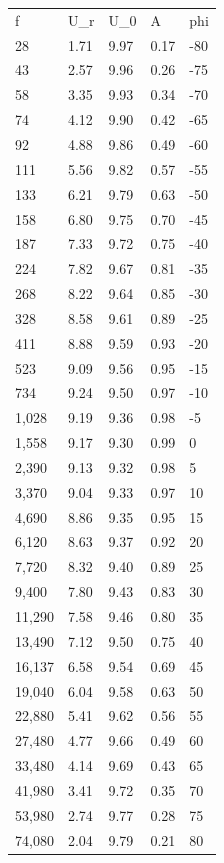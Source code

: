 \documentclass[UTF8]{ctexart}
\begin{document}
\begin{table}[htbp]
\centering
\begin{tabular}{|l|l|l|l|l|}
f&U\_r&U\_0&A&phi\\
28&1.71&9.97&0.17&-80\\
43&2.57&9.96&0.26&-75\\
58&3.35&9.93&0.34&-70\\
74&4.12&9.90&0.42&-65\\
92&4.88&9.86&0.49&-60\\
111&5.56&9.82&0.57&-55\\
133&6.21&9.79&0.63&-50\\
158&6.80&9.75&0.70&-45\\
187&7.33&9.72&0.75&-40\\
224&7.82&9.67&0.81&-35\\
268&8.22&9.64&0.85&-30\\
328&8.58&9.61&0.89&-25\\
411&8.88&9.59&0.93&-20\\
523&9.09&9.56&0.95&-15\\
734&9.24&9.50&0.97&-10\\
1,028&9.19&9.36&0.98&-5\\
1,558&9.17&9.30&0.99&0\\
2,390&9.13&9.32&0.98&5\\
3,370&9.04&9.33&0.97&10\\
4,690&8.86&9.35&0.95&15\\
6,120&8.63&9.37&0.92&20\\
7,720&8.32&9.40&0.89&25\\
9,400&7.80&9.43&0.83&30\\
11,290&7.58&9.46&0.80&35\\
13,490&7.12&9.50&0.75&40\\
16,137&6.58&9.54&0.69&45\\
19,040&6.04&9.58&0.63&50\\
22,880&5.41&9.62&0.56&55\\
27,480&4.77&9.66&0.49&60\\
33,480&4.14&9.69&0.43&65\\
41,980&3.41&9.72&0.35&70\\
53,980&2.74&9.77&0.28&75\\
74,080&2.04&9.79&0.21&80\\
\end{tabular}
\end{table}
\newpage
\end{document}
